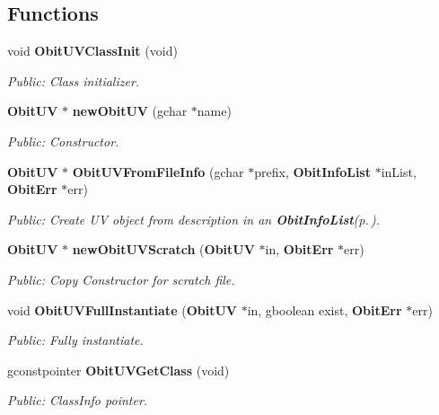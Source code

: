 \subsection*{Functions}
\begin{CompactItemize}
\item 
void {\bf Obit\-UVClass\-Init} (void)
\begin{CompactList}\small\item\em Public: Class initializer. \item\end{CompactList}\item 
{\bf Obit\-UV} $\ast$ {\bf new\-Obit\-UV} (gchar $\ast$name)
\begin{CompactList}\small\item\em Public: Constructor. \item\end{CompactList}\item 
{\bf Obit\-UV} $\ast$ {\bf Obit\-UVFrom\-File\-Info} (gchar $\ast$prefix, {\bf Obit\-Info\-List} $\ast$in\-List, {\bf Obit\-Err} $\ast$err)
\begin{CompactList}\small\item\em Public: Create UV object from description in an {\bf Obit\-Info\-List}{\rm (p.\,\pageref{structObitInfoList})}. \item\end{CompactList}\item 
{\bf Obit\-UV} $\ast$ {\bf new\-Obit\-UVScratch} ({\bf Obit\-UV} $\ast$in, {\bf Obit\-Err} $\ast$err)
\begin{CompactList}\small\item\em Public: Copy Constructor for scratch file. \item\end{CompactList}\item 
void {\bf Obit\-UVFull\-Instantiate} ({\bf Obit\-UV} $\ast$in, gboolean exist, {\bf Obit\-Err} $\ast$err)
\begin{CompactList}\small\item\em Public: Fully instantiate. \item\end{CompactList}\item 
gconstpointer {\bf Obit\-UVGet\-Class} (void)
\begin{CompactList}\small\item\em Public: Class\-Info pointer. \item\end{CompactList}\item 

\end{CompactItemize}
